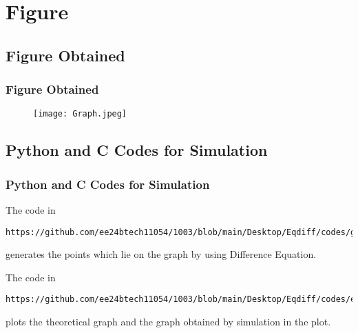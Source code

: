 \documentclass{beamer}
\theoremstyle{remark}
\numberwithin{equation}{section}
\begin{document}
\section{Figure}
\subsection{Figure Obtained}
\begin{frame}[fragile]
\frametitle{Figure Obtained}
\begin{figure}[ht!]
   \centering
   \texttt{[image: Graph.jpeg]}
    \label{stemplot}
\end{figure}
\end{frame}

\subsection{Python and C Codes for Simulation}
\begin{frame}[fragile]
\frametitle{Python and C Codes for Simulation}
The code in 
{\footnotesize
\begin{lstlisting}
https://github.com/ee24btech11054/1003/blob/main/Desktop/Eqdiff/codes/generate.c
\end{lstlisting}
}
generates the points which lie on the graph by using Difference Equation.

The code in 
{\footnotesize
\begin{lstlisting}
https://github.com/ee24btech11054/1003/blob/main/Desktop/Eqdiff/codes/eqdiff.py
\end{lstlisting}
}
plots the theoretical graph and the graph obtained by simulation in the plot.
\end{frame}
\end{document}
